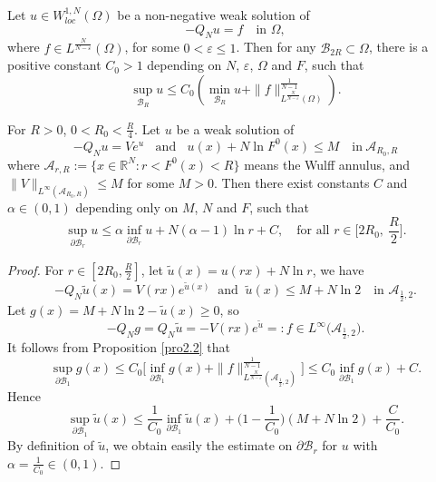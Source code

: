 \documentclass[10pt,a4paper]{amsart}
\def \p{\partial}
\newcommand{\A}{\mathcal{A}}
\newcommand{\B}{\mathcal{B}}
\begin{document}
\begin{prop}\label{pro2.2}
Let $u\in W^{1,N}_{loc}(\Omega)$ be a non-negative weak solution of
$$-Q_{N}u=f \quad\mbox{in }\Omega,$$
where $f\in L^{\frac{N}{N-\varepsilon}}(\Omega)$, for some $0<\varepsilon\leq1$. Then for any $\mathcal{B}_{2R}\subset\Omega$, there is a positive constant $C_0 > 1$ depending on $N$, $\varepsilon$, $\Omega$ and $F$, such that
$$
\sup_{\mathcal{B}_{R}}u\leq C_0\left(\min\limits_{\mathcal{B}_{R}}u+\| f\|^{\frac{1}{N-1}}_{L^{\frac{N}{N-\varepsilon}}(\Omega)}\right).
$$
\end{prop}

\begin{lem}\label{lem3.3}
For $R>0$, $0<R_{0}<\frac{R}{4}$. Let $u$ be a weak solution of
$$-Q_{N}u =Ve^{u} \;\; \mbox{ and  }\;\; u(x)+N\ln F^{0}(x) \leq M  \quad \mbox{in}~\A_{R_0, R}$$
where $\A_{r, R} :=\{x\in\mathbb{R}^{N}: r<F^{0}(x)<R\}$ means the Wulff annulus, and $\|V\|_{L^{\infty}(\A_{R_0, R})}\leq M$ for some $M > 0$. Then there exist constants $C$ and $\alpha\in(0,1)$ depending only on $M$, $N$ and $F$, such that
$$
\sup\limits_{\p\B_r}u \leq \alpha\inf\limits_{\p\B_r}u +N(\alpha-1)\ln r+C,\quad\mbox{for all } r\in \Big[2R_{0},~\frac{R}{2}\Big].
$$
\end{lem}

\begin{proof}
For $r\in[2R_{0}, \frac{R}{2}]$, let $\widetilde{u}(x)=u(rx)+N\ln r$, we have
$$
-Q_{N}\widetilde{u}(x)=V(rx)e^{\widetilde{u}(x)}\;\; \mbox{and}\;\; \widetilde{u}(x) \leq M + N\ln2 \quad\mbox{in } \A_{\frac{1}{2}, 2}.
$$
 Let $g(x)= M+N\ln2-\widetilde{u}(x)\geq0$, so
$$
-Q_{N}g =Q_{N}\widetilde{u} =-V(rx)e^{\widetilde{u}}=:f\in L^{\infty}\big(\A_{\frac{1}{2}, 2}\big).
$$
It follows from Proposition \ref{pro2.2} that
$$
\sup\limits_{\p\B_1}g(x)\leq C_0\Big[\inf\limits_{\p\B_1}g(x)+\| f\|^{\frac{1}{N-1}}_{L^{\frac{N}{N-\varepsilon}}(\A_{\frac{1}{2}, 2})}\Big] \leq C_0 \inf\limits_{\p\B_1}g(x) + C.
$$
Hence
$$\sup\limits_{\p\B_1}\widetilde{u}(x)\leq\frac{1}{C_0}\inf\limits_{\p\B_1}\widetilde{u}(x)+\Big(1-\frac{1}{C_0}\Big)(M+N\ln2)+ \frac{C}{C_0}.$$
By definition of $\widetilde u$, we obtain easily the estimate on $\p\B_r$ for $u$ with $\alpha=\frac{1}{C_0}\in (0,1).$
\end{proof}
\end{document}
